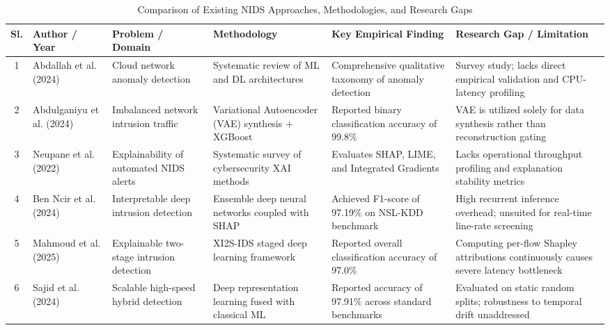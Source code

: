 \documentclass[12pt,a4paper]{report}
\begin{document}
\begin{table}[H]
\centering
\caption{Comparison of Existing NIDS Approaches, Methodologies, and Research Gaps}
\label{tab:literature_review}
\scriptsize
\setlength{\tabcolsep}{3pt}
\renewcommand{\arraystretch}{1.12}

\begin{tabularx}{\textwidth}{
|c|
>{\raggedright\arraybackslash}p{}|
>{\raggedright\arraybackslash}p{}|
>{\raggedright\arraybackslash}p{}|
>{\raggedright\arraybackslash}p{}|
Y|}
\hline
\textbf{Sl.} &
\textbf{Author / Year} &
\textbf{Problem / Domain} &
\textbf{Methodology} &
\textbf{Key Empirical Finding} &
\textbf{Research Gap / Limitation} \\
\hline

1 & Abdallah et al. (2024)
& Cloud network anomaly detection
& Systematic review of ML and DL architectures
& Comprehensive qualitative taxonomy of anomaly detection
& Survey study; lacks direct empirical validation and CPU-latency profiling \\
\hline

2 & Abdulganiyu et al. (2024)
& Imbalanced network intrusion traffic
& Variational Autoencoder (VAE) synthesis + XGBoost
& Reported binary classification accuracy of 99.8\%
& VAE is utilized solely for data synthesis rather than reconstruction gating \\
\hline

3 & Neupane et al. (2022)
& Explainability of automated NIDS alerts
& Systematic survey of cybersecurity XAI methods
& Evaluates SHAP, LIME, and Integrated Gradients
& Lacks operational throughput profiling and explanation stability metrics \\
\hline

4 & Ben Ncir et al. (2024)
& Interpretable deep intrusion detection
& Ensemble deep neural networks coupled with SHAP
& Achieved F1-score of 97.19\% on NSL-KDD benchmark
& High recurrent inference overhead; unsuited for real-time line-rate screening \\
\hline

5 & Mahmoud et al. (2025)
& Explainable two-stage intrusion detection
& XI2S-IDS staged deep learning framework
& Reported overall classification accuracy of 97.0\%
& Computing per-flow Shapley attributions continuously causes severe latency bottleneck \\
\hline

6 & Sajid et al. (2024)
& Scalable high-speed hybrid detection
& Deep representation learning fused with classical ML
& Reported accuracy of 97.91\% across standard benchmarks
& Evaluated on static random splits; robustness to temporal drift unaddressed \\
\hline


\end{tabularx}
\end{table}
\end{document}
